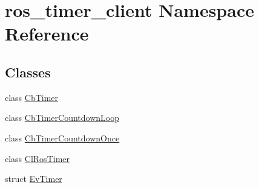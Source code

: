 \hypertarget{namespaceros__timer__client}{}\section{ros\+\_\+timer\+\_\+client Namespace Reference}
\label{namespaceros__timer__client}
\subsection*{Classes}
\begin{DoxyCompactItemize}
\item 
class \hyperlink{classros__timer__client_1_1CbTimer}{Cb\+Timer}
\item 
class \hyperlink{classros__timer__client_1_1CbTimerCountdownLoop}{Cb\+Timer\+Countdown\+Loop}
\item 
class \hyperlink{classros__timer__client_1_1CbTimerCountdownOnce}{Cb\+Timer\+Countdown\+Once}
\item 
class \hyperlink{classros__timer__client_1_1ClRosTimer}{Cl\+Ros\+Timer}
\item 
struct \hyperlink{structros__timer__client_1_1EvTimer}{Ev\+Timer}
\end{DoxyCompactItemize}
